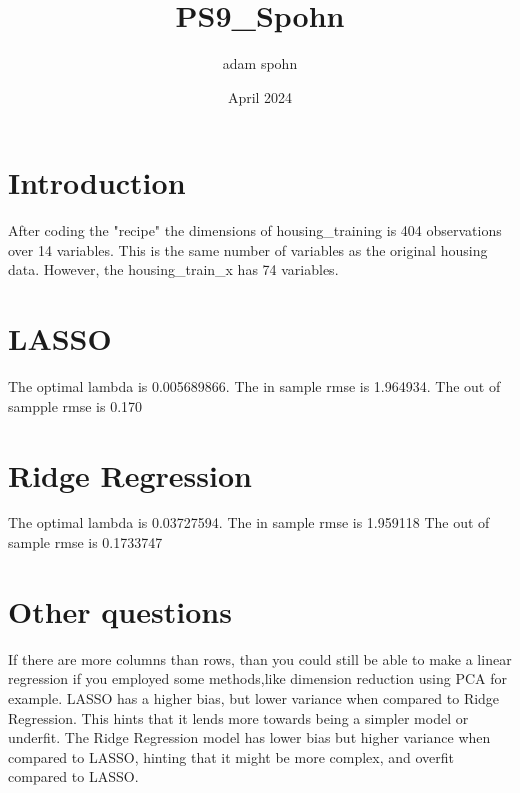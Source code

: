\documentclass{article}
\title{PS9_Spohn}
\author{adam spohn}
\date{April 2024}
\begin{document}
\maketitle

\section{Introduction}

After coding the "recipe" the dimensions of housing\_training is 404 observations over 14 variables. This is the same number of variables as the original housing data. However, the housing\_train\_x has 74 variables. 
\section{LASSO}
The optimal lambda is 0.005689866.
The in sample rmse is 1.964934.
The out of sampple rmse is 0.170

\section{Ridge Regression}
The optimal lambda is 0.03727594.
The in sample rmse is 1.959118
The out of sample rmse is  0.1733747


\section{Other questions}
If there are more columns than rows, than you could still be able to make a linear regression if you employed some methods,like dimension reduction using PCA for example. 
LASSO has a higher bias, but lower variance when compared to Ridge Regression. This hints that it lends more towards being a simpler model or underfit. 
The Ridge Regression model has lower bias but higher variance when compared to LASSO, hinting that it might be more complex, and overfit compared to LASSO.
\end{document}
